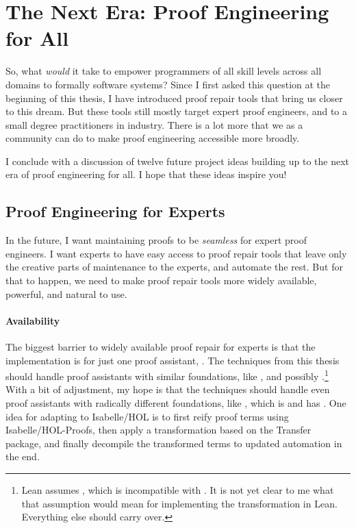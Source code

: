 \section*{The Next Era: Proof Engineering for All}


So, what \textit{would} it take to empower programmers of all skill levels across all domains to formally  software systems?
Since I first asked this question at the beginning of this thesis, I have introduced proof repair tools that bring us closer to this dream.
But these tools still mostly target expert proof engineers, and to a small degree practitioners in industry.
There is a lot more that we as a community can do to make proof engineering accessible more broadly.

I conclude with a discussion of twelve future project ideas building up to the next era of proof engineering for all.
I hope that these ideas inspire you!

\subsection*{Proof Engineering for Experts}

In the future, I want maintaining proofs to be \emph{seamless} for expert proof engineers.
I want experts to have easy access to proof repair tools that leave only the creative parts of maintenance to the experts, and automate the rest.
But for that to happen, we need to make proof repair tools more widely available, powerful, and natural to use.

\paragraph{Availability}
The biggest barrier to widely available proof repair for experts is that the implementation is for just one proof assistant, .
The techniques from this thesis should handle proof assistants with similar foundations, like ,
and possibly .\footnote{Lean assumes , which is incompatible with .
It is not yet clear to me what that assumption would mean for implementing the \toolnamec transformation in Lean.
Everything else should carry over.}
With a bit of adjustment, my hope is that the techniques should handle even proof assistants with radically different foundations,
like , which is  and has .
One idea for adapting \toolnamec to Isabelle/HOL is to first reify proof terms using Isabelle/HOL-Proofs,
then apply a transformation based on the Transfer~\cite{Huffman2013} package, and finally decompile the transformed terms to updated automation in the end.

